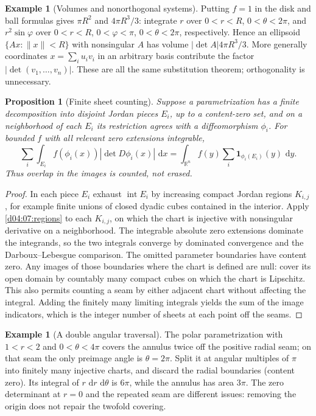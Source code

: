 \documentclass[11pt,oneside,openany]{book}
\newtheorem{proposition}[theorem]{Proposition}
\theoremstyle{definition}
\newtheorem{example}[theorem]{Example}
\theoremstyle{remark}
\newcommand{\R}{\mathbb R}
\newcommand{\norm}[1]{\lVert#1\rVert}
\newcommand{\dd}{\,\mathrm d}
\newcommand{\family}[1]{}
\begin{document}
\begin{example}[Volumes and nonorthogonal systems]\label{d04:07:volumes}
Putting $f=1$ in the disk and ball formulas gives $\pi R^2$ and $4\pi R^3/3$: integrate $r$ over $0<r<R$, $0<\theta<2\pi$, and $r^2\sin\varphi$ over $0<r<R$, $0<\varphi<\pi$, $0<\theta<2\pi$, respectively. Hence an ellipsoid $\{Ax:\norm x<R\}$ with nonsingular $A$ has volume $|\det A|4\pi R^3/3$. More generally coordinates $x=\sum_i u_i v_i$ in an arbitrary basis contribute the factor $|\det(v_1,\ldots,v_n)|$. These are all the same substitution theorem; orthogonality is unnecessary.
\end{example}

\family{K04.07.09}
\begin{proposition}[Finite sheet counting]\label{d04:07:multiplicity}
Suppose a parametrization has a finite decomposition into disjoint Jordan pieces $E_i$, up to a content-zero set, and on a neighborhood of each $E_i$ its restriction agrees with a diffeomorphism $\phi_i$. For bounded $f$ with all relevant zero extensions integrable,
\[
 \sum_i\int_{E_i}f(\phi_i(x))|\det D\phi_i(x)|\,\dd x
 =\int_{\R^n} f(y)\sum_i\mathbf1_{\phi_i(E_i)}(y)\,\dd y.
\]
Thus overlap in the images is counted, not erased.
\end{proposition}
\begin{proof}
In each piece $E_i$ exhaust $\operatorname{int}E_i$ by increasing compact Jordan regions $K_{i,j}$, for example finite unions of closed dyadic cubes contained in the interior. Apply \cref{d04:07:regions} to each $K_{i,j}$, on which the chart is injective with nonsingular derivative on a neighborhood. The integrable absolute zero extensions dominate the integrands, so the two integrals converge by dominated convergence and the Darboux--Lebesgue comparison. The omitted parameter boundaries have content zero. Any images of those boundaries where the chart is defined are null: cover its open domain by countably many compact cubes on which the chart is Lipschitz. This also permits counting a seam by either adjacent chart without affecting the integral. Adding the finitely many limiting integrals yields the sum of the image indicators, which is the integer number of sheets at each point off the seams.
\end{proof}

\begin{example}[A double angular traversal]\label{d04:07:double-angle}
The polar parametrization with $1<r<2$ and $0<\theta<4\pi$ covers the annulus twice off the positive radial seam; on that seam the only preimage angle is $\theta=2\pi$. Split it at angular multiples of $\pi$ into finitely many injective charts, and discard the radial boundaries (content zero). Its integral of $r\,\dd r\,\dd\theta$ is $6\pi$, while the annulus has area $3\pi$. The zero determinant at $r=0$ and the repeated seam are different issues: removing the origin does not repair the twofold covering.
\end{example}
\end{document}
